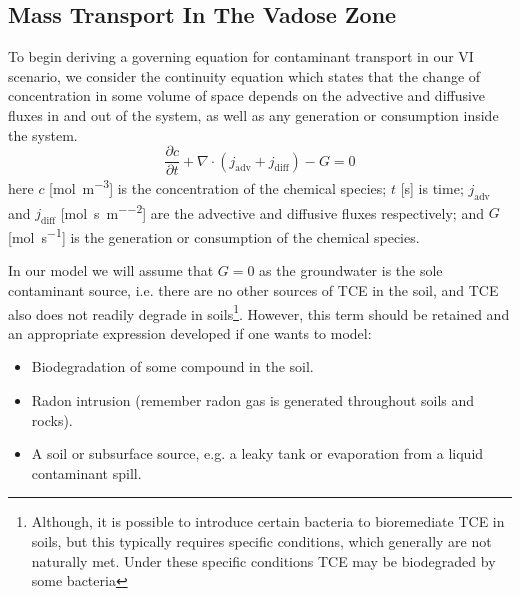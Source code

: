 \subsection{Mass Transport In The Vadose Zone}\label{sec:transport}

To begin deriving a governing equation for contaminant transport in our VI scenario, we consider the continuity equation which states that the change of concentration in some volume of space depends on the advective and diffusive fluxes in and out of the system, as well as any generation or consumption inside the system.
\begin{equation}
  \frac{\partial c}{\partial t} + \nabla \cdot(j_\mathrm{adv} + j_\mathrm{diff}) - G = 0
\end{equation}
here $c$ [\si{\mol\per\metre\cubed}] is the concentration of the chemical species;
$t$ [\si{\second}] is time;
$j_\mathrm{adv}$ and $j_\mathrm{diff}$ [\si{\mol\per\second\per\metre\squared}] are the advective and diffusive fluxes respectively;
and $G$ [\si{\mol\per\second}] is the generation or consumption of the chemical species.\par

In our model we will assume that $G = 0$ as the groundwater is the sole contaminant source, i.e. there are no other sources of TCE in the soil, and TCE also does not readily degrade in soils\footnote{
Although, it is possible to introduce certain bacteria to bioremediate TCE in soils, but this typically requires specific conditions, which generally are not naturally met. Under these specific conditions TCE may be biodegraded by some bacteria\cite{fan_biodegradation_1993,little_trichloroethylene_1988}
}.
However, this term should be retained and an appropriate expression developed if one wants to model:
\begin{itemize}
  \item Biodegradation of some compound in the soil.
  \item Radon intrusion (remember radon gas is generated throughout soils and rocks).
  \item A soil or subsurface source, e.g. a leaky tank or evaporation from a liquid contaminant spill.
\end{itemize}\par


